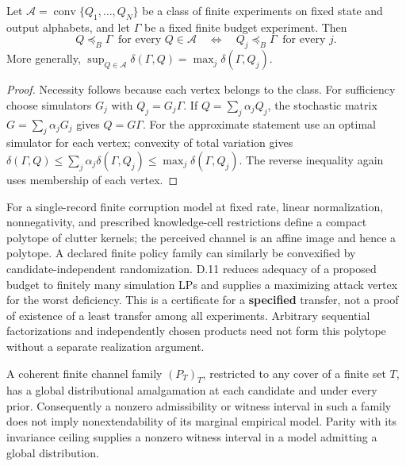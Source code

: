 
\begin{thmplain}

Let \(\mathcal A=\operatorname{conv}\{Q_1,\ldots,Q_N\}\) be a class of finite experiments on fixed state and output alphabets, and let \(\Gamma\) be a fixed finite budget experiment. Then
\[
Q\preceq_B\Gamma\ \text{ for every } Q\in\mathcal A
\quad\Longleftrightarrow\quad
Q_j\preceq_B\Gamma\ \text{ for every } j.
\]
More generally, \(\sup_{Q\in\mathcal A}\delta(\Gamma,Q)=\max_j\delta(\Gamma,Q_j)\).
\end{thmplain}

\begin{proof}

Necessity follows because each vertex belongs to the class. For sufficiency choose simulators \(G_j\) with \(Q_j=G_j\Gamma\). If \(Q=\sum_j\alpha_jQ_j\), the stochastic matrix \(G=\sum_j\alpha_jG_j\) gives \(Q=G\Gamma\). For the approximate statement use an optimal simulator for each vertex; convexity of total variation gives \(\delta(\Gamma,Q)\le\sum_j\alpha_j\delta(\Gamma,Q_j)\le\max_j\delta(\Gamma,Q_j)\). The reverse inequality again uses membership of each vertex.
\end{proof}

For a single-record finite corruption model at fixed rate, linear normalization, nonnegativity, and prescribed knowledge-cell restrictions define a compact polytope of clutter kernels; the perceived channel is an affine image and hence a polytope. A declared finite policy family can similarly be convexified by candidate-independent randomization. D.11 reduces adequacy of a proposed budget to finitely many simulation LPs and supplies a maximizing attack vertex for the worst deficiency. This is a certificate for a \textbf{specified} transfer, not a proof of existence of a least transfer among all experiments. Arbitrary sequential factorizations and independently chosen products need not form this polytope without a separate realization argument.


\begin{thmplain}

A coherent finite channel family \((P_T)_T\), restricted to any cover of a finite set \(T\), has a global distributional amalgamation at each candidate and under every prior. Consequently a nonzero admissibility or witness interval in such a family does not imply nonextendability of its marginal empirical model. Parity with its invariance ceiling supplies a nonzero witness interval in a model admitting a global distribution.
\end{thmplain}

